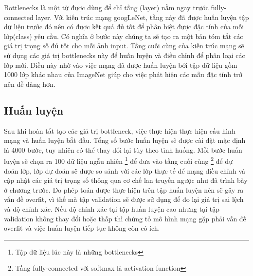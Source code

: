 	Bottlenecks\cite{bottlenecks} là một từ được dùng để chỉ tầng (layer) nằm ngay trước fully-connected layer. Với kiến trúc mạng googLeNet, tầng này đã được huấn luyện tập dữ liệu trước đó nên có được kết quả đủ tốt để phân biệt được đặc tính của mỗi lớp(class) yêu cầu. Có nghĩa ở bước này chúng ta sẽ tạo ra một bản tóm tắt các giá trị trọng số đủ tốt cho mỗi ảnh input. Tầng cuối cùng của kiến trúc mạng sẽ sử dụng các giá trị bottlenecks này để huấn luyện và điều chỉnh để phân loại các lớp mới. Điều này nhờ vào việc mạng đã được huấn luyện bởi tập dữ liệu gồm 1000 lớp khác nhau của ImageNet giúp cho việc phát hiện các mẫu đặc tính trở nên dễ dàng hơn.
	
	\subsection{Huấn luyện}
		
	Sau khi hoàn tất tạo các giá trị bottleneck, việc thực hiện thực hiện cấu hình mạng và huấn luyện bắt đầu. Tổng số bước huấn luyện sẽ được cài đặt mặc định là 4000 bước, tuy nhiên có thể thay đổi lại tùy theo tình huống. Mỗi bước huấn luyện sẽ chọn ra 100 dữ liệu ngẫu nhiên \footnote{Tập dữ liệu lúc này là những bottlenecks} để đưa vào tầng cuối cùng \footnote{Tầng fully-connected với softmax là activation function} để dự đoán lớp, lớp dự đoán sẽ được so sánh với các lớp thực tế để mạng điều chỉnh và cập nhật các giá trị trọng số thông qua cơ chế lan truyền ngược như đã trình bày ở chương trước. Do phép toán được thực hiện trên tập huấn luyện nên sẽ  gây ra vấn đề overfit, vì thế mà tập validation sẽ được sử dụng để đo lại giá trị sai lệch và độ chính xác. Nếu độ chính xác tại tập huấn luyện cao nhưng tại tập validation không thay đổi hoặc thấp thì chứng tỏ mô hình mạng gặp phải vấn đề overfit và việc huấn luyện tiếp tục không còn có ích.
	


